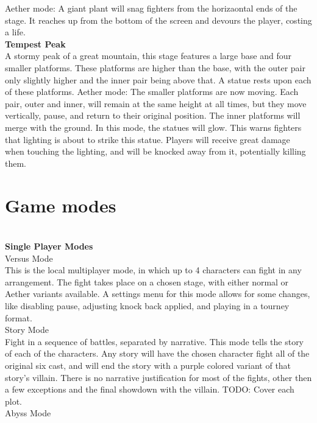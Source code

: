\documentclass{article}
\begin{document}
Aether mode: A giant plant will snag fighters from the horizaontal ends of the stage. It reaches up from the bottom of the screen and devours the player, costing a life.
\\
\textbf{Tempest Peak}\\
A stormy peak of a great mountain, this stage features a large base and four smaller  platforms. These platforms are higher than the base, with the outer pair only slightly higher and the inner pair being above that. A statue rests upon each of these platforms.
Aether mode: The smaller platforms are now moving. Each pair, outer and inner, will remain at the same height at all times, but they move vertically, pause, and return to their original position. The inner platforms will merge with the ground. In this mode, the statues will glow. This warns fighters that lighting is about to strike this statue. Players will receive great damage when touching the lighting, and will be knocked away from it, potentially killing them.
\\

\chapter{Game modes}\\


\textbf{Single Player Modes}\\ %

Versus Mode\\
This is the local multiplayer mode, in which up to 4 characters can fight in any arrangement. The fight takes place on a chosen stage, with either normal or Aether variants available. A settings menu for this mode allows for some changes, like disabling pause, adjusting knock back applied, and playing in a tourney format.
\\

Story Mode\\
Fight in a sequence of battles, separated by narrative. This mode tells the story of each of the characters. Any story will have the chosen character fight all of the original six cast, and will end the story with a purple colored variant of that story's villain. There is no narrative justification for most of the fights, other then a few exceptions and the final showdown with the villain.
TODO: Cover each plot.
\\

Abyss Mode\\
\end{document}
